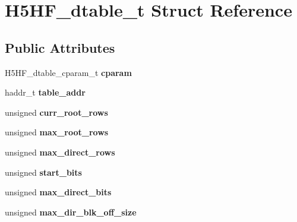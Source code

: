\hypertarget{struct_h5_h_f__dtable__t}{}\section{H5\+H\+F\+\_\+dtable\+\_\+t Struct Reference}
\label{struct_h5_h_f__dtable__t}
\subsection*{Public Attributes}
\begin{DoxyCompactItemize}
\item 
\mbox{\label{struct_h5_h_f__dtable__t_a882817c19dc8bc7ad15ebace4619e538}} 
H5\+H\+F\+\_\+dtable\+\_\+cparam\+\_\+t {\bfseries cparam}
\item 
\mbox{\label{struct_h5_h_f__dtable__t_a0330187c00db31998089a5ca2e44df78}} 
haddr\+\_\+t {\bfseries table\+\_\+addr}
\item 
\mbox{\label{struct_h5_h_f__dtable__t_a57344ea263fa92d81b62347885d17905}} 
unsigned {\bfseries curr\+\_\+root\+\_\+rows}
\item 
\mbox{\label{struct_h5_h_f__dtable__t_aa9f4bd192e8c2d580005b27cea4a7a58}} 
unsigned {\bfseries max\+\_\+root\+\_\+rows}
\item 
\mbox{\label{struct_h5_h_f__dtable__t_a2b0384d25ca7c0e54cadf0700f067602}} 
unsigned {\bfseries max\+\_\+direct\+\_\+rows}
\item 
\mbox{\label{struct_h5_h_f__dtable__t_a6814584465a90ba93e0db26f951172c3}} 
unsigned {\bfseries start\+\_\+bits}
\item 
\mbox{\label{struct_h5_h_f__dtable__t_a01377cc9945123f3f5f1b6ddf42bdb64}} 
unsigned {\bfseries max\+\_\+direct\+\_\+bits}
\item 
\mbox{\label{struct_h5_h_f__dtable__t_a1d7c378ccc9de96746fe3e049a564f63}} 
unsigned {\bfseries max\+\_\+dir\+\_\+blk\+\_\+off\+\_\+size}
\item 
\mbox{\label{struct_h5_h_f__dtable__t_a4c8af3d46386e9ac8d9387690634499a}} 

\end{DoxyCompactItemize}
